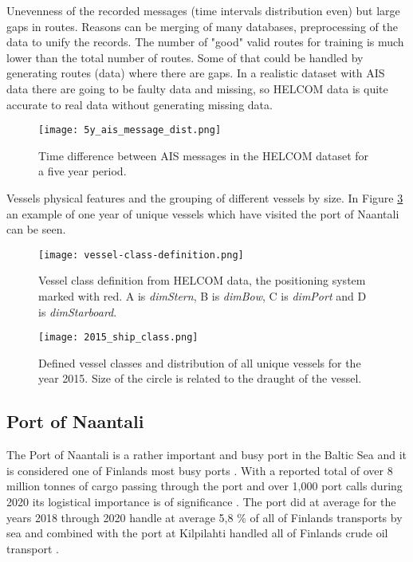 \documentclass[../main.tex]{subfiles}
\begin{document}
Unevenness of the recorded messages (time intervals distribution even) but large gaps in routes. Reasons can be merging of many databases, preprocessing of the data to unify the records. The number of "good" valid routes for training is much lower than the total number of routes. Some of that could be handled by generating routes (data) where there are gaps. In a realistic dataset with AIS data there are going to be faulty data and missing, so HELCOM data is quite accurate to real data without generating missing data.


\begin{figure}[H]
	\centering
	\texttt{[image: 5y\_ais\_message\_dist.png]}
	\caption{Time difference between AIS messages in the HELCOM dataset for a five year period.}
	\label{fig:ais-msg-dist}
\end{figure}


Vessels physical features and the grouping of different vessels by size. In Figure \ref{fig:vessel-classes} an example of one year of unique vessels which have visited the port of Naantali can be seen. 

\begin{figure}[H]
	\centering
	\texttt{[image: vessel-class-definition.png]}
	\caption{Vessel class definition from HELCOM data, the positioning system marked with red. A is \textit{dimStern}, B is \textit{dimBow}, C is \textit{dimPort} and D is \textit{dimStarboard}.}
	\label{fig:vessel-class-def}
\end{figure}

\begin{figure}[H]
	\centering
	\texttt{[image: 2015\_ship\_class.png]}
	\caption{Defined vessel classes and distribution of all unique vessels for the year 2015. Size of the circle is related to the draught of the vessel.}
	\label{fig:vessel-classes}
\end{figure}


\subsection{Port of Naantali}

The Port of Naantali is a rather important and busy port in the Baltic Sea and it is considered one of Finlands most busy ports \cite{SVRY_2022}. With a reported total of over 8 million tonnes of cargo passing through the port and over 1,000 port calls during 2020 its logistical importance is of significance \cite{PoN_2021}. The port did at average for the years 2018 through 2020 handle at average 5,8 \% of all of Finlands transports by sea and combined with the port at Kilpilahti handled all of Finlands crude oil transport \cite{TRAFICOM_2021}.
\end{document}
